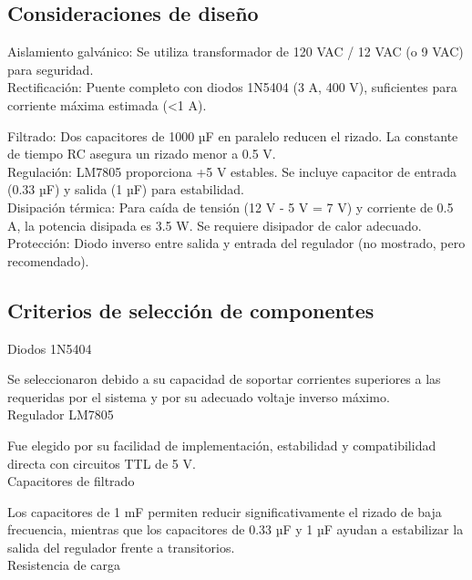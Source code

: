 \documentclass[journal]{IEEEtran}
\begin{document}
\subsection{Consideraciones de diseño}

Aislamiento galvánico: Se utiliza transformador de 120 VAC / 12 VAC (o 9 VAC) para seguridad.\\

Rectificación: Puente completo con diodos 1N5404 (3 A, 400 V), suficientes para corriente máxima estimada (<1 A).

Filtrado: Dos capacitores de 1000 µF en paralelo reducen el rizado. La constante de tiempo RC asegura un rizado menor a 0.5 V.\\

Regulación: LM7805 proporciona +5 V estables. Se incluye capacitor de entrada (0.33 µF) y salida (1 µF) para estabilidad.\\

Disipación térmica: Para caída de tensión (12 V - 5 V = 7 V) y corriente de 0.5 A, la potencia disipada es 3.5 W. Se requiere disipador de calor adecuado.\\

Protección: Diodo inverso entre salida y entrada del regulador (no mostrado, pero recomendado).\\

\subsection{Criterios de selección de componentes}

Diodos 1N5404

Se seleccionaron debido a su capacidad de soportar corrientes superiores a las requeridas por el sistema y por su adecuado voltaje inverso máximo.\\

Regulador LM7805

Fue elegido por su facilidad de implementación, estabilidad y compatibilidad directa con circuitos TTL de 5 V.\\

Capacitores de filtrado

Los capacitores de 1 mF permiten reducir significativamente el rizado de baja frecuencia, mientras que los capacitores de 0.33 µF y 1 µF ayudan a estabilizar la salida del regulador frente a transitorios.\\

Resistencia de carga
\end{document}
